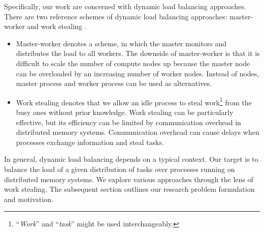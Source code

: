 Specifically, our work are concerned with dynamic load balancing approaches. There are two reference schemes of dynamic load balancing approaches: master-worker \cite{Riakiotakis2011MasterWorkerModel} \cite{Chronopoulos2005ScaleMasterWorkerModel} and work stealing \cite{Blumofe1999OriginWS} \cite{dinan2009scalable}.
\begin{itemize}
	\item Master-worker denotes a scheme, in which the master monitors and distributes the load to all workers. The downside of master-worker is that it is difficult to scale the number of compute nodes up because the master node can be overloaded by an increasing number of worker nodes. Instead of nodes, master process and worker process can be used as alternatives.
	\item Work stealing denotes that we allow an idle process to steal work\footnote{``\textit{Work}'' and ``\textit{task}'' might be used interchangeably.} from the busy ones without prior knowledge. Work stealing can be particularly effective, but its efficiency can be limited by communication overhead in distributed memory systems. Communication overhead can cause delays when processes exchange information and steal tasks.
\end{itemize}

In general, dynamic load balancing depends on a typical context. Our target is to balance the load of a given distribution of tasks over processes running on distributed memory systems. We explore various approaches through the lens of work stealing. The subsequent section outlines our research problem formulation and motivation.















